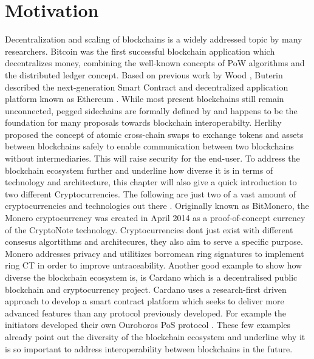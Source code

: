 \section{Motivation}
\label{sec:intro:motivation}
Decentralization and scaling of blockchains is a widely addressed topic by many researchers. Bitcoin \cite{nakamoto2008peer} was the first successful blockchain application which decentralizes money, combining the well-known concepts of \ac{PoW} algorithms and the distributed ledger concept. Based on previous work by Wood \cite{wood2014ethereum}, Buterin described the next-generation Smart Contract and decentralized application platform known as Ethereum \cite{buterin2013ethereum} \cite{buterin2014ethereum}. While most present blockchains still remain unconnected, pegged sidechains are formally defined by \cite{back2014enabling} and happens to be the foundation for many proposals towards blockchain interoperabilty. Herlihy proposed the concept of atomic cross-chain swaps to exchange tokens and assets between blockchains safely \cite{herlihy2018atomic} to enable communication between two blockchains without intermediaries. This will raise security for the end-user. To address the blockchain ecosystem further and underline how diverse it is in terms of technology and architecture, this chapter will also give a quick introduction to two different Cryptocurrencies. The following are just two of a vast amount of cryptocurrencies and technologies out there \cite{coinmarketcap}. Originally known as BitMonero, the Monero cryptocurrency was created in April 2014 \cite{alonso2020zero} as a proof-of-concept currency of the CryptoNote \cite{van2013cryptonote} technology. Cryptocurrencies dont just exist with different consesus algortithms and architecures, they also aim to serve a specific purpose. Monero addresses privacy and utilitizes borromean ring signatures \cite{maxwell2015borromean} to implement ring \ac{CT} \cite{noether2016ring} in order to improve untraceability. Another good example to show how diverse the blockchain ecosystem is, is Cardano which is a decentralised public blockchain and cryptocurrency project. Cardano uses a research-first driven approach to develop a smart contract platform which seeks to deliver more advanced features than any protocol previously developed. For example the initiators developed their own Ouroboros \ac{PoS} protocol \cite{kiayias2017ouroboros}. These few examples already point out the diversity of the blockchain ecosystem and underline why it is so important to address interoperability between blockchains in the future.


